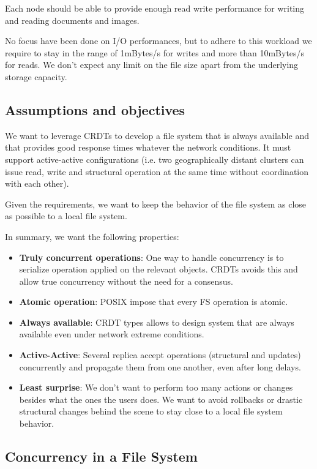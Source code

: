 \documentclass[sigplan, 10pt]{acmart}
\begin{document}
Each node should be able to provide enough read write performance
for writing and reading documents and images.

No focus have been done on I/O performances, but to adhere to this
workload we require to stay in the range of 1mBytes/s for writes
and more than 10mBytes/s for reads. We don't expect any limit on the file size
apart from the underlying storage capacity.

\subsection{Assumptions and objectives}

We want to leverage CRDTs to develop a file system that is always available
and that provides good response times whatever the network conditions.
It must support active-active configurations (i.e. two geographically distant
clusters can issue read, write and structural operation at the same time without
coordination with each other).

Given the requirements, we want to keep the behavior of the file system as
close as possible to a local file system.

In summary, we want the following properties:

\begin{itemize}
    \item \textbf{Truly concurrent operations}: One way to
    handle concurrency is to serialize operation applied on the relevant objects.
    CRDTs avoids this and allow true concurrency without the need for a consensus.
    \item \textbf{Atomic operation}: POSIX impose that every FS operation
    is atomic.
    \item \textbf{Always available}: CRDT types allows to design system that
    are always available even under network extreme conditions.
    \item \textbf{Active-Active}: Several replica accept
    operations (structural and updates) concurrently and propagate them
    from one another, even after long delays.
    \item \textbf{Least surprise}: We don't want to perform too many actions
    or changes besides what the ones the users does. We want to
    avoid rollbacks or drastic structural changes behind the scene to stay close
    to a local file system behavior.
\end{itemize}

\subsection{Concurrency in a File System}
\end{document}
